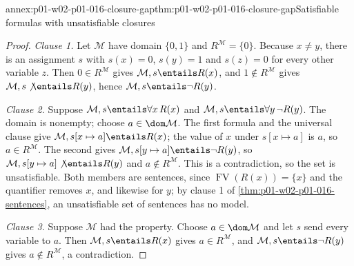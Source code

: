 \begin{annexitem}{annex:p01-w02-p01-016-closure-gap}{thm:p01-w02-p01-016-closure-gap}{Satisfiable formulas with unsatisfiable closures}
\begin{proof}
\emph{Clause 1.} Let \(\mathcal M\) have domain \(\{0,1\}\) and
\(R^{\mathcal M}=\{0\}\). Because \(x\ne y\), there is an assignment \(s\)
with \(s(x)=0\), \(s(y)=1\) and \(s(z)=0\) for every other variable \(z\).
Then \(0\in R^{\mathcal M}\) gives \(\mathcal M,s\entails R(x)\), and
\(1\notin R^{\mathcal M}\) gives \(\mathcal M,s\not\entails R(y)\), hence
\(\mathcal M,s\entails\neg R(y)\).

\emph{Clause 2.} Suppose \(\mathcal M,s\entails\forall x\,R(x)\) and
\(\mathcal M,s\entails\forall y\,\neg R(y)\). The domain is nonempty; choose
\(a\in\dom\mathcal M\). The first formula and the universal clause give
\(\mathcal M,s[x\mapsto a]\entails R(x)\); the value of \(x\) under
\(s[x\mapsto a]\) is \(a\), so \(a\in R^{\mathcal M}\). The second gives
\(\mathcal M,s[y\mapsto a]\entails\neg R(y)\), so
\(\mathcal M,s[y\mapsto a]\not\entails R(y)\) and \(a\notin R^{\mathcal M}\).
This is a contradiction, so the set is unsatisfiable. Both members are
sentences, since \(\operatorname{FV}(R(x))=\{x\}\) and the quantifier removes
\(x\), and likewise for \(y\); by clause 1 of
\cref{thm:p01-w02-p01-016-sentences}, an unsatisfiable set of sentences has
no model.

\emph{Clause 3.} Suppose \(\mathcal M\) had the property. Choose
\(a\in\dom\mathcal M\) and let \(s\) send every variable to \(a\). Then
\(\mathcal M,s\entails R(x)\) gives \(a\in R^{\mathcal M}\), and
\(\mathcal M,s\entails\neg R(y)\) gives \(a\notin R^{\mathcal M}\), a
contradiction.
\end{proof}
\end{annexitem}

